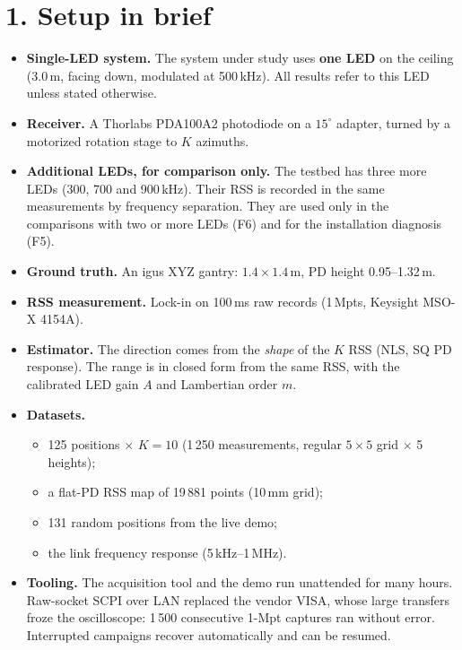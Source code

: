 \documentclass[10.5pt,a4paper]{article}
\begin{document}
\section*{1. Setup in brief}
\begin{itemize}
\item \textbf{Single-LED system.} The system under study uses \textbf{one LED} on the ceiling (3.0\,m,
  facing down, modulated at 500\,kHz). All results refer to this LED unless stated otherwise.
\item \textbf{Receiver.} A Thorlabs PDA100A2 photodiode on a $15^\circ$ adapter, turned by a motorized
  rotation stage to $K$ azimuths.
\item \textbf{Additional LEDs, for comparison only.} The testbed has three more LEDs (300, 700 and
  900\,kHz). Their RSS is recorded in the same measurements by frequency separation. They are used only
  in the comparisons with two or more LEDs (F6) and for the installation diagnosis (F5).
\item \textbf{Ground truth.} An igus XYZ gantry: $1.4\times1.4$\,m, PD height 0.95--1.32\,m.
\item \textbf{RSS measurement.} Lock-in on 100\,ms raw records (1\,Mpts, Keysight MSO-X 4154A).
\item \textbf{Estimator.} The direction comes from the \emph{shape} of the $K$ RSS (NLS, SQ PD
  response). The range is in closed form from the same RSS, with the calibrated LED gain $A$ and
  Lambertian order $m$.
\item \textbf{Datasets.}
  \begin{itemize}
  \item 125 positions $\times$ $K=10$ (1\,250 measurements, regular $5\times5$ grid $\times$ 5
    heights);
  \item a flat-PD RSS map of 19\,881 points (10\,mm grid);
  \item 131 random positions from the live demo;
  \item the link frequency response (5\,kHz--1\,MHz).
  \end{itemize}
\item \textbf{Tooling.} The acquisition tool and the demo run unattended for many hours. Raw-socket
  SCPI over LAN replaced the vendor VISA, whose large transfers froze the oscilloscope: 1\,500
  consecutive 1-Mpt captures ran without error. Interrupted campaigns recover automatically and can be
  resumed.
\end{itemize}
\end{document}
